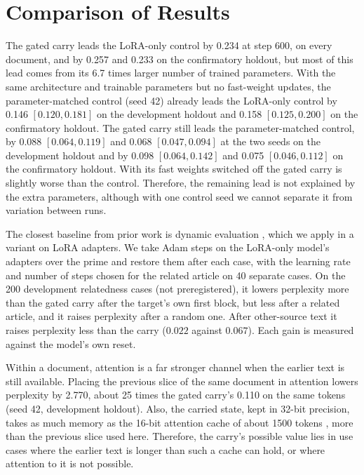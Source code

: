 \documentclass[12pt,a4paper]{report}
\begin{document}
\section{Comparison of Results}
\label{sec-compare}

The gated carry leads the LoRA-only control by 0.234 at step 600, on every document, and by 0.257 and 0.233 on the confirmatory holdout, but most of this lead comes from its 6.7 times larger number of trained parameters. With the same architecture and trainable parameters but no fast-weight updates, the parameter-matched control (seed 42) already leads the LoRA-only control by 0.146 $[0.120, 0.181]$ on the development holdout and 0.158 $[0.125, 0.200]$ on the confirmatory holdout. The gated carry still leads the parameter-matched control, by 0.088 $[0.064, 0.119]$ and 0.068 $[0.047, 0.094]$ at the two seeds on the development holdout and by 0.098 $[0.064, 0.142]$ and 0.075 $[0.046, 0.112]$ on the confirmatory holdout. With its fast weights switched off the gated carry is slightly worse than the control. Therefore, the remaining lead is not explained by the extra parameters, although with one control seed we cannot separate it from variation between runs.

The closest baseline from prior work is dynamic evaluation \citep{krause2018dynamic,krause2019dynamic}, which we apply in a variant on LoRA adapters. We take Adam \citep{kingma2015adam} steps on the LoRA-only model's adapters over the prime and restore them after each case, with the learning rate and number of steps chosen for the related article on 40 separate cases. On the 200 development relatedness cases (not preregistered), it lowers perplexity more than the gated carry after the target's own first block, but less after a related article, and it raises perplexity after a random one. After other-source text it raises perplexity less than the carry ($0.022$ against $0.067$). Each gain is measured against the model's own reset.

Within a document, attention is a far stronger channel when the earlier text is still available. Placing the previous slice of the same document in attention lowers perplexity by 2.770, about 25 times the gated carry's 0.110 on the same tokens (seed 42, development holdout). Also, the carried state, kept in 32-bit precision, takes as much memory as the 16-bit attention cache of about 1500 tokens \citep{ainslie2023gqa,yang2025qwen3}, more than the previous slice used here. Therefore, the carry's possible value lies in use cases where the earlier text is longer than such a cache can hold, or where attention to it is not possible.
\end{document}
